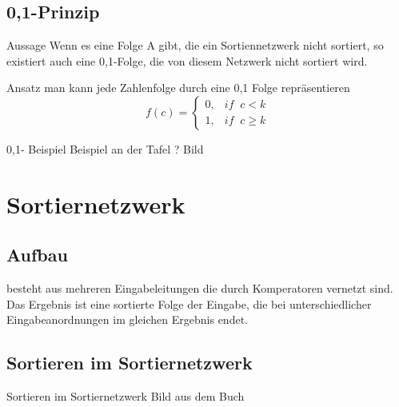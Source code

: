 \documentclass[ucs,9pt]{beamer}
\begin{document}
\subsection{0,1-Prinzip}
\begin{frame}{Aussage}
Wenn es eine Folge A gibt, die ein Sortiennetzwerk nicht sortiert, so existiert auch eine 0,1-Folge, die von diesem Netzwerk nicht sortiert wird.
\end{frame}
\begin{frame}{Ansatz}
man kann jede Zahlenfolge durch eine 0,1 Folge repräsentieren
$$
f(c) = \begin{cases} 0 , & if \;\;c < k \\
1 , & if \;\;c \geq k
\end{cases}
$$
\end{frame}
\begin{frame}{0,1- Beispiel}
Beispiel an der Tafel ? Bild
\end{frame}


\section{Sortiernetzwerk}
\subsection{Aufbau}
\begin{frame}
besteht aus mehreren Eingabeleitungen die durch Komperatoren vernetzt sind.
Das Ergebnis ist eine sortierte Folge der Eingabe,
die bei unterschiedlicher Eingabeanordnungen im gleichen Ergebnis endet.
\end{frame}
\subsection{Sortieren im Sortiernetzwerk}
\begin{frame}{Sortieren im Sortiernetzwerk}
Bild aus dem Buch
\end{frame}
\end{document}
